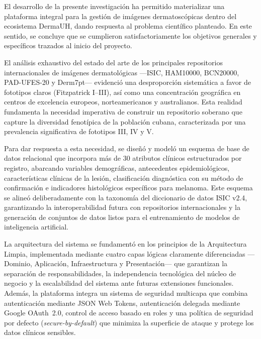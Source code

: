 \begin{conclusions}
El desarrollo de la presente investigación ha permitido materializar una plataforma integral para la 
gestión de imágenes dermatoscópicas dentro del ecosistema DermaUH, dando respuesta al problema científico 
planteado. En este sentido, se concluye que se cumplieron 
satisfactoriamente los objetivos generales y específicos trazados al inicio del proyecto.

El análisis exhaustivo del estado del arte de los principales repositorios internacionales de imágenes 
dermatológicas ---ISIC, HAM10000, BCN20000, PAD-UFES-20 y Derm7pt--- evidenció una desproporción 
sistemática a favor de fototipos claros (Fitzpatrick I--III), así como una concentración 
geográfica en centros de excelencia europeos, norteamericanos y australianos. Esta realidad fundamenta la 
necesidad imperativa de construir un repositorio soberano que capture la diversidad fenotípica de la 
población cubana, caracterizada por una prevalencia significativa de fototipos III, IV y V.

Para dar respuesta a esta necesidad, se diseñó y modeló un esquema de base de datos relacional que 
incorpora más de 30 atributos clínicos estructurados por registro, abarcando variables demográficas, 
antecedentes epidemiológicos, características clínicas de la lesión, clasificación diagnóstica con su 
método de confirmación e indicadores histológicos específicos para melanoma. Este esquema se alineó 
deliberadamente con la taxonomía del diccionario de datos ISIC v2.4, garantizando la interoperabilidad 
futura con repositorios internacionales y la generación de conjuntos de datos listos para el entrenamiento 
de modelos de inteligencia artificial.

La arquitectura del sistema se fundamentó en los principios de la Arquitectura Limpia, implementada 
mediante cuatro capas lógicas claramente diferenciadas ---Dominio, Aplicación, Infraestructura y 
Presentación--- que garantizan la separación de responsabilidades, la independencia tecnológica del 
núcleo de negocio y la escalabilidad del sistema ante futuras extensiones funcionales. Además, la 
plataforma integra un sistema de seguridad multicapa que combina autenticación mediante JSON Web Tokens, 
autenticación delegada mediante Google OAuth~2.0, control de acceso basado en 
roles y una política de seguridad por defecto (\textit{secure-by-default}) que minimiza la superficie de 
ataque y protege los datos clínicos sensibles.


\end{conclusions}

